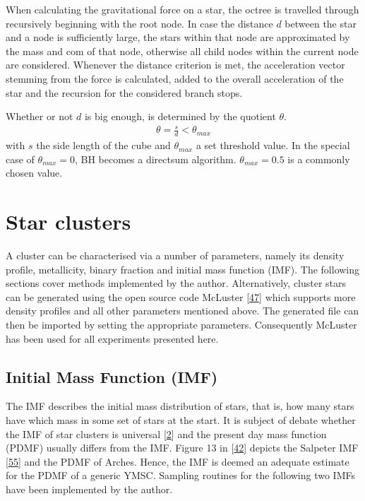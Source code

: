 \documentclass[letterpaper,10pt,english]{sphinxmanual}
\begin{document}
				\sphinxAtStartPar
				When calculating the gravitational force on a star, the octree is travelled through recursively beginning with the root node.
				In case the distance \(d\) between the star and a node is sufficiently large, the stars within that node are approximated by the mass and com of that node,
				otherwise all child nodes within the current node are considered. Whenever the distance criterion is met,
				the acceleration vector stemming from the force is calculated, added to the overall acceleration of the star and the recursion for the considered branch stops.
				
				\sphinxAtStartPar
				Whether or not \(d\) is big enough, is determined by the quotient \(\theta\).
				\begin{equation*}
				\begin{split}\theta = \frac{s}{d} < \theta_{max}\end{split}
				\end{equation*}
				\sphinxAtStartPar
				with \(s\) the side length of the cube and \(\theta_{max}\) a set threshold value.
				In the special case of \(\theta_{max}=0\), BH becomes a direct\sphinxhyphen{}sum algorithm. \(\theta_{max}=0.5\) is a commonly chosen value.
				

	\section{Star clusters}
		\label{\detokenize{NBodySimulation/Initialization:cluster}}
		\sphinxAtStartPar
		A cluster can be characterised via a number of parameters, namely its density profile, metallicity, binary fraction and initial mass function (IMF).
		The following sections cover methods implemented by the author. Alternatively, cluster stars can be generated using the open source code McLuster {[}\hyperlink{cite.NBodySimulation/Appendix:id35}{47}{]} which supports more density profiles and all other parameters mentioned above.
		The generated file can then be imported by setting the appropriate parameters. Consequently McLuster has been used for all experiments presented here.
		
		
		\subsection{Initial Mass Function (IMF)}
			\label{\detokenize{NBodySimulation/Initialization:initial-mass-function-imf}}
			\sphinxAtStartPar
			The IMF describes the initial mass distribution of stars, that is, how many stars have which mass in some set of stars at the start.
			It is subject of debate whether the IMF of star clusters is universal {[}\hyperlink{cite.NBodySimulation/Appendix:id45}{2}{]} and the present day mass function (PDMF) usually differs from the IMF.
			Figure 13 in {[}\hyperlink{cite.NBodySimulation/Appendix:id44}{42}{]} depicts the Salpeter IMF {[}\hyperlink{cite.NBodySimulation/Appendix:id49}{55}{]} and the PDMF of Arches. Hence, the IMF is deemed an adequate estimate for the PDMF of a generic YMSC.
			Sampling routines for the following two IMFs have been implemented by the author.
		
\end{document}
